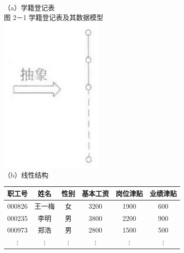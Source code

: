 \documentclass[10pt]{article}
\begin{document}
（a）学籍登记表\\
图 2－1 学籍登记表及其数据模型\\
\includegraphics[max width=\textwidth, center]{2025_06_06_704745ea57b15b2333e5g-041(1)}\\
（b）线性结构

\begin{center}
\begin{tabular}{|c|c|c|c|c|c|}
\hline
职工号 & 姓名 & 性别 & 基本工资 & 岗位津贴 & 业绩津贴 \\
\hline
000826 & 王一梅 & 女 & 3200 & 1900 & 600 \\
\hline
000235 & 李明 & 男 & 3800 & 2200 & 900 \\
\hline
000973 & 郑浩 & 男 & 2800 & 1500 & 500 \\
\hline
$\vdots$ & $\vdots$ & $\vdots$ & $\vdots$ & $\vdots$ & $\vdots$ \\
\hline
\end{tabular}
\end{center}
\end{document}
